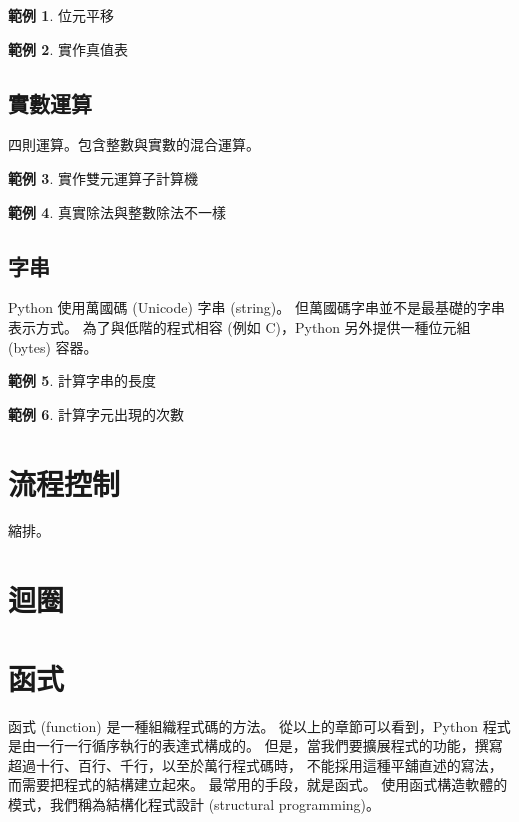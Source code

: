 \documentclass[a4paper,12pt]{book}
\theoremstyle{definition}
\newtheorem{example}{範例}[chapter]
\begin{document}
\begin{example}
位元平移
\end{example}

\begin{example}
實作真值表
\end{example}

\section{實數運算}

四則運算。包含整數與實數的混合運算。

\begin{example}
實作雙元運算子計算機
\end{example}

\begin{example}
真實除法與整數除法不一樣
\end{example}

\section{字串}

Python 使用萬國碼 (Unicode) 字串 (string)。
但萬國碼字串並不是最基礎的字串表示方式。
為了與低階的程式相容 (例如 C)，Python 另外提供一種位元組 (bytes) 容器。

\begin{example}
計算字串的長度
\end{example}

\begin{example}
計算字元出現的次數
\end{example}

\chapter{流程控制}
%
\label{c:flow}

縮排。

\chapter{迴圈}
%
\label{c:loop}

\chapter{函式}
%
\label{c:function}

函式 (function) 是一種組織程式碼的方法。
從以上的章節可以看到，Python 程式是由一行一行循序執行的表達式構成的。
但是，當我們要擴展程式的功能，撰寫超過十行、百行、千行，以至於萬行程式碼時，
不能採用這種平舖直述的寫法，而需要把程式的結構建立起來。
最常用的手段，就是函式。
使用函式構造軟體的模式，我們稱為結構化程式設計 (structural programming)。
\end{document}
